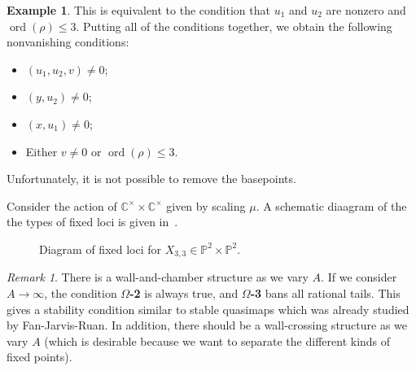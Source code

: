 \documentclass[10pt]{amsart}
\theoremstyle{definition}
\newtheorem{exm}[thm]{Example}
\theoremstyle{remark}
\newtheorem{rmk}[thm]{Remark}
\theoremstyle{plain}
\theoremstyle{definition}
\theoremstyle{remark}
\newcommand{\C}{\mathbb{C}}
\renewcommand{\P}{\mathbb{P}}
\newcommand{\mc}[1]{\mathcal{#1}}
\newcommand{\mr}[1]{\mathrm{#1}}
\newcommand{\on}[1]{\operatorname{#1}}
\newcommand{\1}{\mathbf{1}}
\newcommand{\2}{\mathbf{2}}
\newcommand{\3}{\mathbf{3}}
\begin{document}
\begin{exm}
    This is equivalent to the condition that $u_1$ and $u_2$ are nonzero and $\on{ord}(\rho)\leq 3$. Putting all of the conditions together, we obtain the following nonvanishing conditions:
    \begin{itemize}
        \item $(u_1, u_2, v) \neq 0$;
        \item $(y, u_2) \neq 0$;
        \item $(x, u_1) \neq 0$;
        \item Either $v \neq 0$ or $\on{ord}(\rho) \leq 3$.
    \end{itemize}
    Unfortunately, it is not possible to remove the basepoints.

    Consider the action of $\C^{\times} \times \C^{\times}$ given by scaling $\mu$. A schematic diaagram of the the types of fixed loci is given in~.
    \begin{figure}[htpb]
    \begin{center}
    \end{center}
    \caption{Diagram of fixed loci for $X_{3,3} \in \P^2 \times \P^2$.}%
    \label{fig:p2p2loc}
    \end{figure}
\end{exm}

\begin{rmk}
    There is a wall-and-chamber structure as we vary $A$. If we consider $A \to \infty$, the condition \textbf{$\Omega$-2} is always true, and \textbf{$\Omega$-3} bans all rational tails. This gives a stability condition similar to stable quasimaps which was already studied by Fan-Jarvis-Ruan. In addition, there should be a wall-crossing structure as we vary $A$ (which is desirable because we want to separate the different kinds of fixed points).
\end{rmk}
\end{document}
